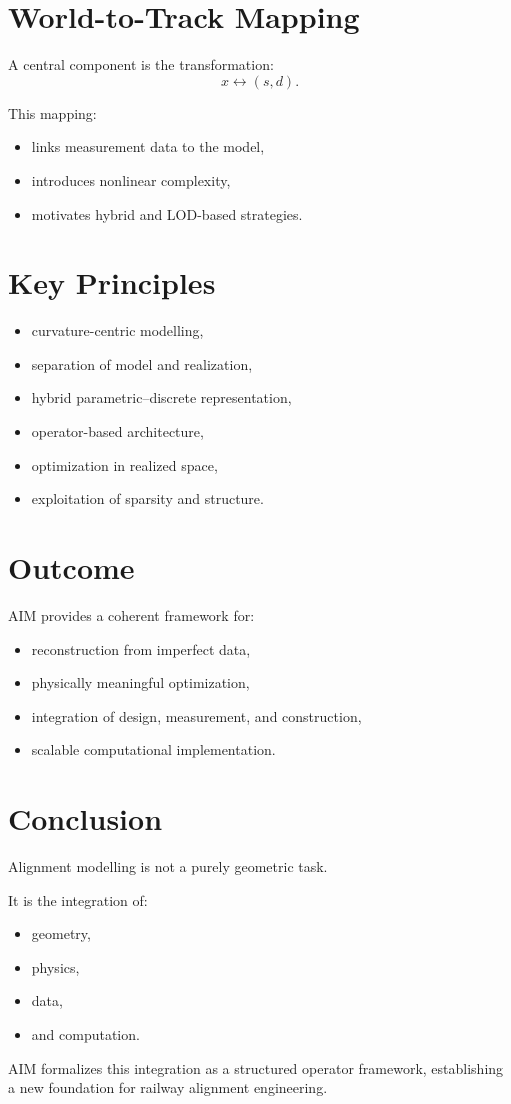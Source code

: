 \section*{World-to-Track Mapping}

A central component is the transformation:
\[
x \leftrightarrow (s,d).
\]

This mapping:
\begin{itemize}
\item links measurement data to the model,
\item introduces nonlinear complexity,
\item motivates hybrid and LOD-based strategies.
\end{itemize}


\section*{Key Principles}

\begin{itemize}
\item curvature-centric modelling,
\item separation of model and realization,
\item hybrid parametric--discrete representation,
\item operator-based architecture,
\item optimization in realized space,
\item exploitation of sparsity and structure.
\end{itemize}


\section*{Outcome}

AIM provides a coherent framework for:
\begin{itemize}
\item reconstruction from imperfect data,
\item physically meaningful optimization,
\item integration of design, measurement, and construction,
\item scalable computational implementation.
\end{itemize}


\section*{Conclusion}

Alignment modelling is not a purely geometric task.

It is the integration of:
\begin{itemize}
\item geometry,
\item physics,
\item data,
\item and computation.
\end{itemize}

AIM formalizes this integration as a structured operator framework,
establishing a new foundation for railway alignment engineering.
